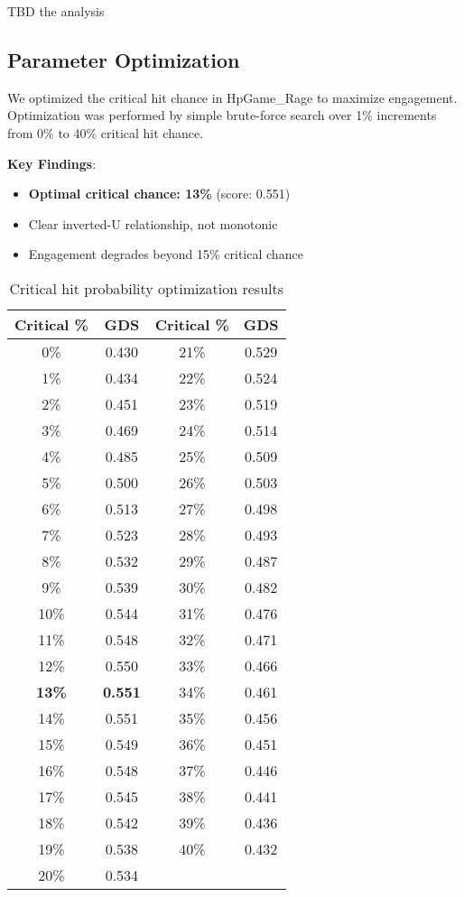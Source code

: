 \documentclass{article}
\begin{document}
TBD the analysis

\subsection{Parameter Optimization}

We optimized the critical hit chance in HpGame\_Rage to maximize engagement. Optimization was performed by simple brute-force search over 1\% increments from 0\% to 40\% critical hit chance.

\textbf{Key Findings}:
\begin{itemize}
\item \textbf{Optimal critical chance: 13\%} (score: 0.551)
\item Clear inverted-U relationship, not monotonic
\item Engagement degrades beyond 15\% critical chance
\end{itemize}

\begin{table}[h]
\centering
\begin{tabular}{|c|c||c|c|}
\hline
Critical \% & GDS & Critical \% & GDS \\
\hline
0\% & 0.430 & 21\% & 0.529 \\
1\% & 0.434 & 22\% & 0.524 \\
2\% & 0.451 & 23\% & 0.519 \\
3\% & 0.469 & 24\% & 0.514 \\
4\% & 0.485 & 25\% & 0.509 \\
5\% & 0.500 & 26\% & 0.503 \\
6\% & 0.513 & 27\% & 0.498 \\
7\% & 0.523 & 28\% & 0.493 \\
8\% & 0.532 & 29\% & 0.487 \\
9\% & 0.539 & 30\% & 0.482 \\
10\% & 0.544 & 31\% & 0.476 \\
11\% & 0.548 & 32\% & 0.471 \\
12\% & 0.550 & 33\% & 0.466 \\
\textbf{13\%} & \textbf{0.551} & 34\% & 0.461 \\
14\% & 0.551 & 35\% & 0.456 \\
15\% & 0.549 & 36\% & 0.451 \\
16\% & 0.548 & 37\% & 0.446 \\
17\% & 0.545 & 38\% & 0.441 \\
18\% & 0.542 & 39\% & 0.436 \\
19\% & 0.538 & 40\% & 0.432 \\
20\% & 0.534 &  &  \\
\hline
\end{tabular}
\caption{Critical hit probability optimization results}
\end{table}
\end{document}
